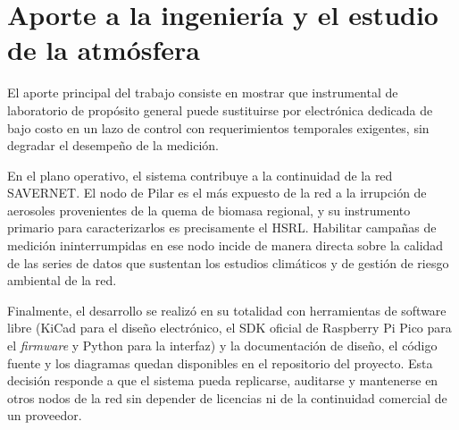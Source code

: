 \section*{Aporte a la ingeniería y el estudio de la atmósfera}

El aporte principal del trabajo consiste en mostrar que instrumental de laboratorio
de propósito general puede sustituirse por electrónica dedicada de bajo costo en un
lazo de control con requerimientos temporales exigentes, sin degradar el desempeño de
la medición. 

En el plano operativo, el sistema contribuye a la continuidad de la red SAVERNET. El
nodo de Pilar es el más expuesto de la red a la irrupción de aerosoles provenientes
de la quema de biomasa regional, y su instrumento primario para caracterizarlos es
precisamente el HSRL. Habilitar campañas de medición ininterrumpidas en ese nodo
incide de manera directa sobre la calidad de las series de datos que sustentan los
estudios climáticos y de gestión de riesgo ambiental de la red.

Finalmente, el desarrollo se realizó en su totalidad con herramientas de software
libre (KiCad para el diseño electrónico, el SDK oficial de Raspberry Pi Pico para
el \emph{firmware} y Python para la interfaz) y la documentación de diseño, el
código fuente y los diagramas quedan disponibles en el repositorio del proyecto. Esta
decisión responde a que el sistema pueda replicarse, auditarse y mantenerse en otros nodos de la red sin
depender de licencias ni de la continuidad comercial de un proveedor.

